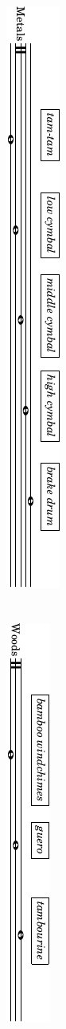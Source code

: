 \documentclass[10pt]{article}
\begin{document}
\begin{textblock}{14}
\begin{itemize}
        \includegraphics{preface-percussion-metals.pdf} \\ \\ \\
        \includegraphics{preface-percussion-woods.pdf} \\ \\ \\

\end{itemize}
\end{textblock}
\end{document}
